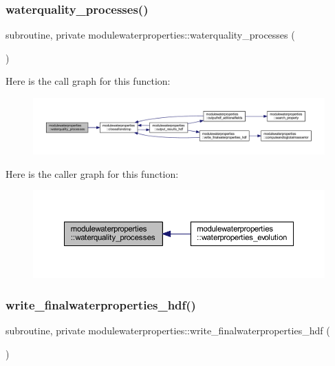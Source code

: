 \subsubsection{\texorpdfstring{waterquality\+\_\+processes()}{waterquality\_processes()}}
{\footnotesize\ttfamily subroutine, private modulewaterproperties\+::waterquality\+\_\+processes (\begin{DoxyParamCaption}{ }\end{DoxyParamCaption})\hspace{0.3cm}{\ttfamily [private]}}

Here is the call graph for this function\+:\nopagebreak
\begin{figure}[H]
\begin{center}
\leavevmode
\includegraphics[width=350pt]{namespacemodulewaterproperties_a330fc5f39079fff0948cbca492cf139a_cgraph}
\end{center}
\end{figure}
Here is the caller graph for this function\+:\nopagebreak
\begin{figure}[H]
\begin{center}
\leavevmode
\includegraphics[width=350pt]{namespacemodulewaterproperties_a330fc5f39079fff0948cbca492cf139a_icgraph}
\end{center}
\end{figure}
\mbox{\label{namespacemodulewaterproperties_a2893cea8ca427b1290aeb65593659aa0}} 
\subsubsection{\texorpdfstring{write\+\_\+finalwaterproperties\+\_\+hdf()}{write\_finalwaterproperties\_hdf()}}
{\footnotesize\ttfamily subroutine, private modulewaterproperties\+::write\+\_\+finalwaterproperties\+\_\+hdf (\begin{DoxyParamCaption}{ }\end{DoxyParamCaption})\hspace{0.3cm}{\ttfamily [private]}}

